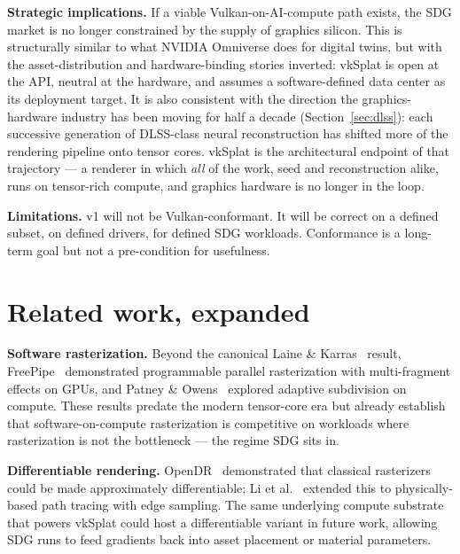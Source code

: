 \documentclass[10pt,journal]{IEEEtran}
\begin{document}
\textbf{Strategic implications.} If a viable Vulkan-on-AI-compute path
exists, the SDG market is no longer constrained by the supply of
graphics silicon. This is structurally similar to what NVIDIA Omniverse
does for digital twins, but with the asset-distribution and
hardware-binding stories inverted: vkSplat is open at the API, neutral
at the hardware, and assumes a software-defined data center as its
deployment target. It is also consistent with the direction the
graphics-hardware industry has been moving for half a decade
(Section~\ref{sec:dlss}): each successive generation of DLSS-class
neural reconstruction has shifted more of the rendering pipeline onto
tensor cores. vkSplat is the architectural endpoint of that
trajectory --- a renderer in which \emph{all} of the work, seed and
reconstruction alike, runs on tensor-rich compute, and graphics
hardware is no longer in the loop.

\textbf{Limitations.} v1 will not be Vulkan-conformant. It will be
correct on a defined subset, on defined drivers, for defined SDG
workloads. Conformance is a long-term goal but not a pre-condition for
usefulness.

\section{Related work, expanded}

\textbf{Software rasterization.} Beyond the canonical Laine \&
Karras~\cite{laine2011software} result, FreePipe~\cite{liu2010freepipe}
demonstrated programmable parallel rasterization with multi-fragment
effects on GPUs, and Patney \& Owens~\cite{patney2010real} explored
adaptive subdivision on compute. These results predate the modern
tensor-core era but already establish that software-on-compute
rasterization is competitive on workloads where rasterization is not
the bottleneck --- the regime SDG sits in.

\textbf{Differentiable rendering.}
OpenDR~\cite{loper2014opendr} demonstrated that classical rasterizers
could be made approximately differentiable; Li et
al.~\cite{li2018edge} extended this to physically-based path tracing
with edge sampling. The same underlying compute substrate that powers
vkSplat could host a differentiable variant in future work, allowing
SDG runs to feed gradients back into asset placement or material
parameters.
\end{document}
